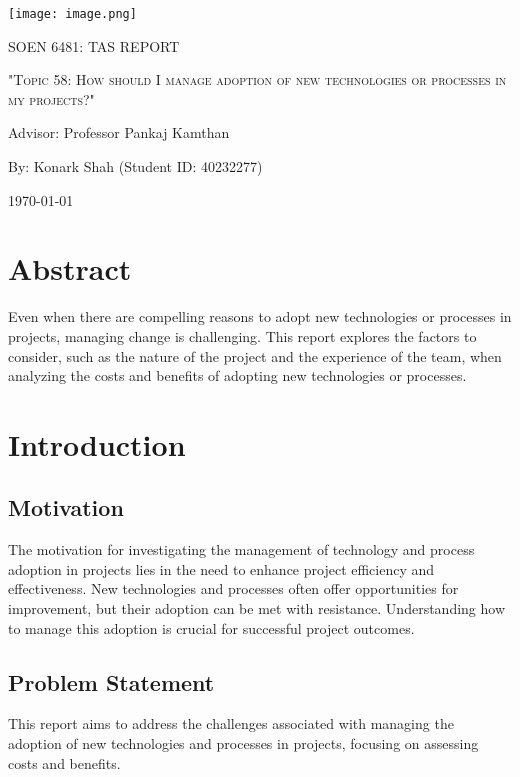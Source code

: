 \documentclass{article}
\begin{document}
\begin{titlepage}
    \centering
    \texttt{[image: image.png]}\par %
    {\scshape\Large SOEN 6481: TAS REPORT \par}
    \vspace{1.5cm}
    {\scshape\Huge "Topic 58: How should I manage adoption of new technologies or processes in my projects?"\par}
    \vspace{1.5cm}
    {\large Advisor: Professor Pankaj Kamthan\par}
    \vspace{1.5cm}
    {\large By: Konark Shah (Student ID: 40232277)\par}
    \vspace{1cm}
    {\large \today\par}
\end{titlepage}



\tableofcontents

\newpage

\section{Abstract}
Even when there are compelling reasons to adopt new technologies or processes in projects, managing change is challenging. This report explores the factors to consider, such as the nature of the project and the experience of the team, when analyzing the costs and benefits of adopting new technologies or processes.

\section{Introduction}
\subsection{Motivation}
The motivation for investigating the management of technology and process adoption in projects lies in the need to enhance project efficiency and effectiveness. New technologies and processes often offer opportunities for improvement, but their adoption can be met with resistance. Understanding how to manage this adoption is crucial for successful project outcomes.
\subsection{Problem Statement}
This report aims to address the challenges associated with managing the adoption of new technologies and processes in projects, focusing on assessing costs and benefits.
\end{document}
